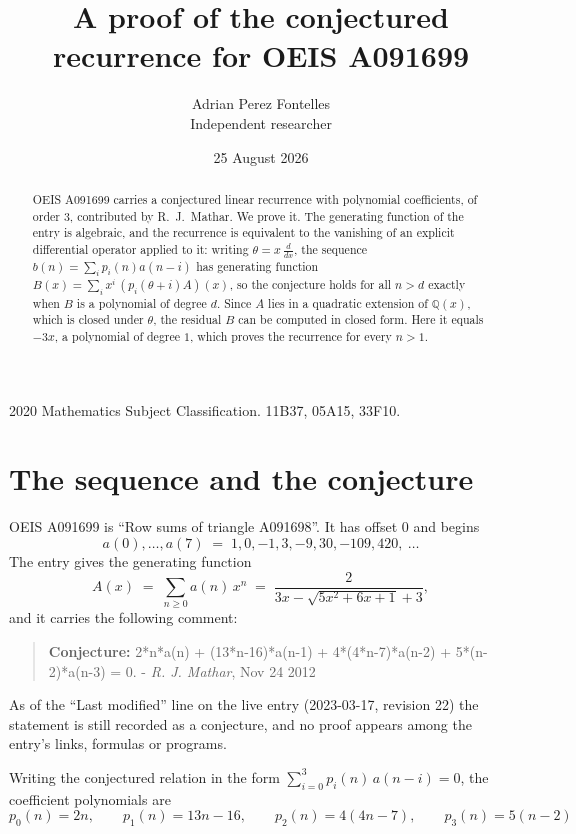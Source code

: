 \documentclass[11pt,a4paper]{article}
\title{A proof of the conjectured recurrence for OEIS A091699}
\author{Adrian Perez Fontelles\\ \small Independent researcher}
\date{25 August 2026}
\theoremstyle{plain}
\theoremstyle{definition}
\begin{document}
\maketitle

\begin{abstract}
OEIS A091699 carries a conjectured linear recurrence with polynomial coefficients, of
order 3, contributed by R.~J.~Mathar. We prove it. The generating function of the
entry is algebraic, and the recurrence is equivalent to the vanishing of an explicit
differential operator applied to it: writing $\theta=x\,\frac{d}{dx}$, the sequence
$b(n)=\sum_{i}p_{i}(n)a(n-i)$ has generating function
$B(x)=\sum_{i}x^{i}\,(p_{i}(\theta+i)A)(x)$, so the conjecture holds for all $n>d$ exactly
when $B$ is a polynomial of degree $d$. Since $A$ lies in a quadratic extension of
$\mathbb{Q}(x)$, which is closed under $\theta$, the residual $B$ can be computed in
closed form. Here it equals $- 3 x$, a polynomial of degree $1$, which proves
the recurrence for every $n>1$.
\end{abstract}

\noindent\small 2020 Mathematics Subject Classification. 11B37, 05A15, 33F10.\normalsize

\section{The sequence and the conjecture}

OEIS A091699 is ``Row sums of triangle A091698''. It has offset $0$ and begins
\[
a(0),\dots,a(7)\;=\;1, 0, -1, 3, -9, 30, -109, 420,\ \dots
\]
The entry gives the generating function
\begin{equation}\label{eq:gf}
A(x)\;=\;\sum_{n\ge 0} a(n)\,x^{n}\;=\;\frac{2}{3 x - \sqrt{5 x^{2} + 6 x + 1} + 3} ,
\end{equation}
and it carries the following comment:
\begin{quote}\small
\textbf{Conjecture:} 2*n*a(n) + (13*n-16)*a(n-1) + 4*(4*n-7)*a(n-2) + 5*(n-2)*a(n-3) = 0. - \emph{R. J. Mathar}, Nov 24 2012
\end{quote}
As of the ``Last modified'' line on the live entry (2023-03-17, revision 22) the
statement is still recorded as a conjecture, and no proof appears among the entry's links,
formulas or programs.

Writing the conjectured relation in the form $\sum_{i=0}^{3}p_{i}(n)\,a(n-i)=0$,
the coefficient polynomials are
\[
p_{0}(n)=2 n,\qquad p_{1}(n)=13 n - 16,\qquad p_{2}(n)=4 \left(4 n - 7\right),\qquad p_{3}(n)=5 \left(n - 2\right)
\]
\end{document}
